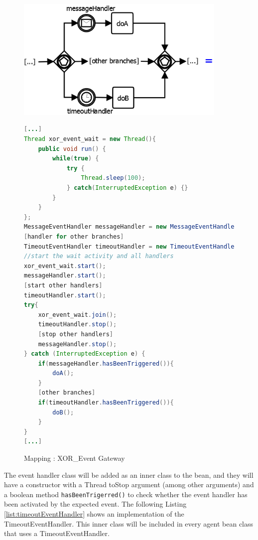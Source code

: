 \begin{figure}[h]
\begin{minipage}[c]{0.5\textwidth}
\includegraphics[width=0.9\textwidth]{images/mapping/xor-event.png}
\end{minipage}
\begin{minipage}[c]{0.5\textwidth}
\begin{lstlisting}[language=Java]
[...]
Thread xor_event_wait = new Thread(){
	public void run() {
		while(true) {
			try {
				Thread.sleep(100);
			} catch(InterruptedException e) {}
		}
	}
};
MessageEventHandler messageHandler = new MessageEventHandler(xor_event_wait);
[handler for other branches]
TimeoutEventHandler timeoutHandler = new TimeoutEventHandler(20000, xor_event_wait);
//start the wait activity and all handlers
xor_event_wait.start();
messageHandler.start();
[start other handlers]
timeoutHandler.start();
try{
	xor_event_wait.join();
	timeoutHandler.stop();
	[stop other handlers]
	messageHandler.stop();
} catch (InterruptedException e) {
	if(messageHandler.hasBeenTriggered()){
		doA();
	}
	[other branches]
	if(timeoutHandler.hasBeenTriggered()){
		doB();
	}
}
[...]
\end{lstlisting}
\end{minipage}
\caption{Mapping : XOR\_Event Gateway}%
\label{fig:mapping_xorEvent}%
\end{figure}
\newpage
The event handler class will be added as an inner class to the bean, and they will have a constructor with a Thread toStop argument (among other arguments) and a boolean method \verb|hasBeenTrigerred()| to check whether the event handler has been activated by the expected event. The following Listing \ref{list:timeoutEventHandler} shows an implementation of the TimeoutEventHandler. This inner class will be included in every agent bean class that uses a TimeoutEventHandler.\\\\

